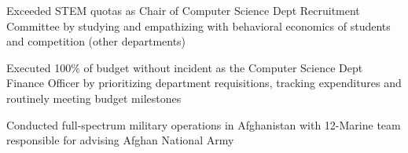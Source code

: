 \documentclass[]{Forester-Resume}
\begin{document}
\begin{minipage}[t]{0.66\textwidth}
\begin{tightemize}
\item Exceeded STEM quotas as Chair of Computer Science Dept Recruitment Committee by studying and empathizing with behavioral economics of students and competition (other departments)

\item Executed 100\% of budget without incident as the Computer Science Dept Finance Officer by prioritizing department requisitions, tracking expenditures and routinely meeting budget milestones

\item Conducted full-spectrum military operations in Afghanistan with 12-Marine team responsible for advising Afghan National Army 

\end{tightemize}


\sectionsep
\end{minipage} 
\end{document}
